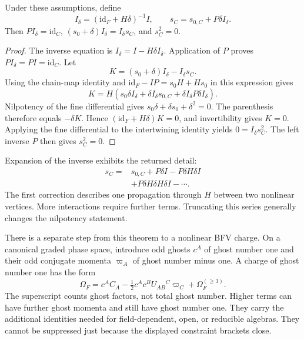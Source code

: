 \begin{theorem}
Under these assumptions, define
\begin{equation}
 I_\delta=(\mathrm{id}_F+H\delta)^{-1}I,
 \qquad
 s_C=s_{0,C}+P\delta I_\delta.
 \label{c:constraints:transfer-formula}
\end{equation}
Then $PI_\delta=\mathrm{id}_C$,
$(s_0+\delta)I_\delta=I_\delta s_C$, and $s_C^2=0$.
\end{theorem}
\begin{proof}
The inverse equation is $I_\delta=I-H\delta I_\delta$.
Application of $P$ proves $PI_\delta=PI=\mathrm{id}_C$.
Let
\begin{equation}
 K=(s_0+\delta)I_\delta-I_\delta s_C.
\end{equation}
Using the chain-map identity and
$\mathrm{id}_F-IP=s_0H+Hs_0$ in this expression gives
\begin{equation}
 K=H\left(s_0\delta I_\delta+
 \delta I_\delta s_{0,C}+\delta I_\delta P\delta I_\delta\right).
\end{equation}
Nilpotency of the fine differential gives
$s_0\delta+\delta s_0+\delta^2=0$. The parenthesis therefore equals $-\delta K$. Hence
$(\mathrm{id}_F+H\delta)K=0$, and invertibility gives $K=0$.
Applying the fine differential to the intertwining identity yields
$0=I_\delta s_C^2$. The left inverse $P$ then gives $s_C^2=0$.
\end{proof}

Expansion of the inverse exhibits the returned detail:
\begin{equation}
 \begin{aligned}
 s_C={}&s_{0,C}+P\delta I-P\delta H\delta I\\
       &+P\delta H\delta H\delta I-\cdots.
 \end{aligned}
\end{equation}
The first correction describes one propagation through $H$ between two nonlinear vertices. More interactions require further terms. Truncating this series generally changes the nilpotency statement.

There is a separate step from this theorem to a nonlinear BFV charge. On a canonical graded phase space, introduce odd ghosts $c^A$ of ghost number one and their odd conjugate momenta $\varpi_A$ of ghost number minus one. A charge of ghost number one has the form
\begin{equation}
 \Omega_F=c^AC_A-\tfrac12c^Ac^BU_{AB}{}^C\varpi_C
             +\Omega_F^{(\ge3)}.
 \label{c:constraints:bfv-charge}
\end{equation}
The superscript counts ghost factors, not total ghost number. Higher terms can have further ghost momenta and still have ghost number one. They carry the additional identities needed for field-dependent, open, or reducible algebras. They cannot be suppressed just because the displayed constraint brackets close.

